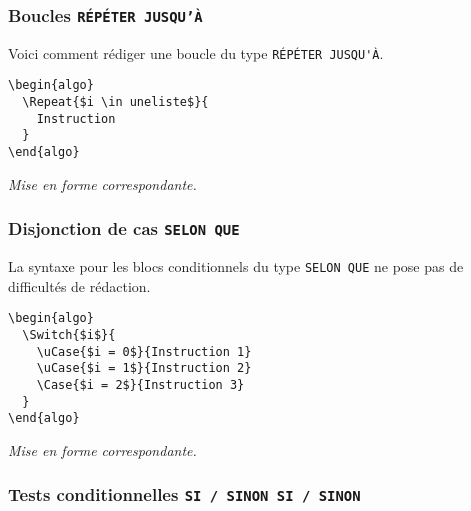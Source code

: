 \documentclass[12pt,a4paper]{article}
\theoremstyle{definition}
\newenvironment{frame-gene}[1][]{
	\begin{tcolorbox}[
		title        = #1, 
		colbacktitle = black!10!white, 
		colback      = white, 
		coltitle     = black,
		fonttitle    = \bfseries\itshape\small, 
		breakable,
		center title]
}{
	\end{tcolorbox}
}
\begin{document}
\subsubsection{Boucles \texttt{RÉPÉTER JUSQU'À}}

Voici comment rédiger une boucle du type \verb+RÉPÉTER JUSQU'À+.


\begin{multicols}{2}
    \centering
    \begin{frame-gene}
\begin{verbatim}
\begin{algo}
  \Repeat{$i \in uneliste$}{
    Instruction 
  }
\end{algo}
\end{verbatim}
    \end{frame-gene}
    \vfill\null
    \columnbreak
    \textit{Mise en forme correspondante.}
\begin{algo}
\end{algo}
    \vfill\null
\end{multicols}


\subsubsection{Disjonction de cas \texttt{SELON QUE}}

La syntaxe pour les blocs conditionnels du type \verb+SELON QUE+ ne pose pas de difficultés de rédaction.


\begin{multicols}{2}
    \centering
    \begin{frame-gene}
\begin{verbatim}
\begin{algo}
  \Switch{$i$}{
    \uCase{$i = 0$}{Instruction 1}
    \uCase{$i = 1$}{Instruction 2}
    \Case{$i = 2$}{Instruction 3}
  }
\end{algo}
\end{verbatim}
    \end{frame-gene}
    \vfill\null
    \columnbreak
    \textit{Mise en forme correspondante.}
\begin{algo}
\end{algo}
    \vfill\null
\end{multicols}


\subsubsection{Tests conditionnelles \texttt{SI / SINON SI / SINON}}
\end{document}
